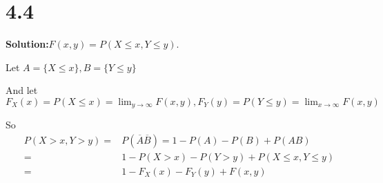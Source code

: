 \documentclass[12pt,a4paper,fontset=none]{ctexart}
\begin{document}
\section*{4.4}
\textbf{Solution:}$F(x,y)=P(X\leq x,Y\leq y).$

Let $A=\{X\leq x\},B=\{Y\leq y\}$

And let $F_X(x)=P(X\leq x)=\lim_{y \to \infty}  F(x,y),F_Y(y)=P(Y\leq y)=\lim_{x \to \infty} F(x,y) $

So \begin{align*}
    P(X>x,Y>y)= & P(\overline{A}\overline{B})=1-P(A)-P(B)+P(AB) \\=&1-P(X>x)-P(Y>y)+P(X\leq x,Y\leq y)\\=&1-F_X(x)-F_Y(y)+F(x,y)
\end{align*}
\end{document}
